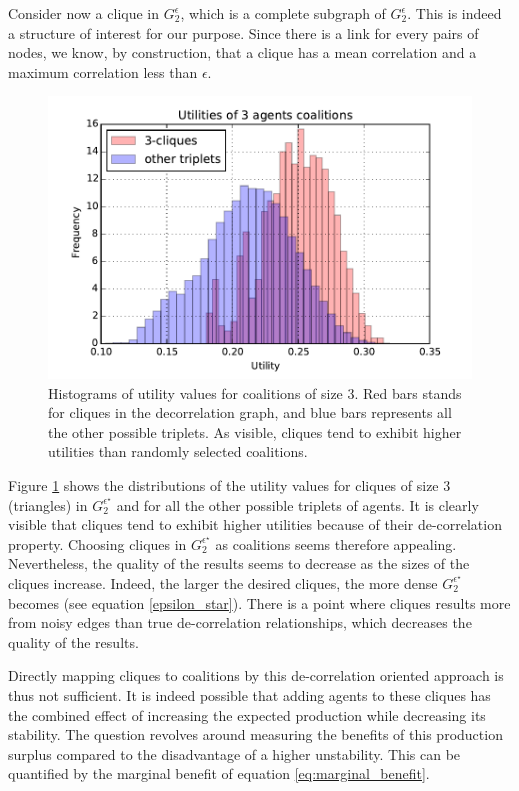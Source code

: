 \documentclass[conference]{IEEEtran}
\begin{document}
Consider now a clique in  $ G_{2}^{\epsilon} $, which is a complete subgraph of $ G_{2}^{\epsilon} $. This is indeed a structure of interest for our purpose. Since there is a link for every pairs of nodes, we know, by construction, that a clique has a mean correlation and a maximum correlation less than $ \epsilon $. 

\begin{figure}
\includegraphics[scale=.6]{cliques_histo.pdf}
\caption{Histograms of utility values for coalitions of size 3. Red bars stands for cliques in the decorrelation graph, and blue bars represents all the other possible triplets. As visible, cliques tend to exhibit higher utilities than randomly selected coalitions.}
\label{fig:histo_cliques}
\end{figure}

Figure \ref{fig:histo_cliques} shows the distributions of the utility values for cliques of size 3 (triangles) in $ G_{2}^{\epsilon^{\star}} $ and for all the other possible triplets of agents. It is clearly visible that cliques tend to exhibit higher utilities because of their de-correlation property. Choosing cliques in $ G_{2}^{\epsilon^{\star}} $ as coalitions seems therefore appealing. Nevertheless, the quality of the results seems to decrease as the sizes of the cliques increase. Indeed, the larger the desired cliques, the more dense $ G_{2}^{\epsilon^{\star}} $ becomes (see equation \ref{epsilon_star}). There is a point where cliques results more from noisy edges than true de-correlation relationships, which decreases the quality of the results.

Directly mapping cliques to coalitions by this de-correlation oriented approach is thus not sufficient. It is indeed possible that adding agents to these cliques has the combined effect of increasing the expected production while decreasing its stability. The question revolves around measuring the benefits of this production surplus compared to the disadvantage of a higher unstability. This can be quantified by the marginal benefit of equation \ref{eq:marginal_benefit}.
\end{document}
